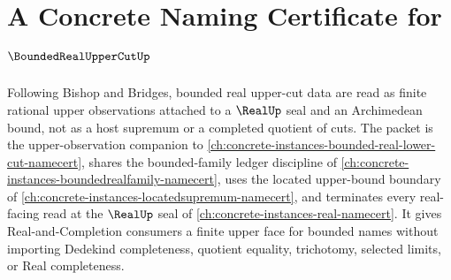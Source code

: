 \chapter{A Concrete Naming Certificate for $\BoundedRealUpperCutUp$}
\label{ch:concrete-instances-bounded-real-upper-cut-namecert}

Following Bishop and Bridges, bounded real upper-cut data are read as finite rational upper observations attached to a $\RealUp$ seal and an Archimedean bound, not as a host supremum or a completed quotient of cuts. The packet is the upper-observation companion to \autoref{ch:concrete-instances-bounded-real-lower-cut-namecert}, shares the bounded-family ledger discipline of \autoref{ch:concrete-instances-boundedrealfamily-namecert}, uses the located upper-bound boundary of \autoref{ch:concrete-instances-locatedsupremum-namecert}, and terminates every real-facing read at the $\RealUp$ seal of \autoref{ch:concrete-instances-real-namecert}. It gives Real-and-Completion consumers a finite upper face for bounded names without importing Dedekind completeness, quotient equality, trichotomy, selected limits, or Real completeness.

